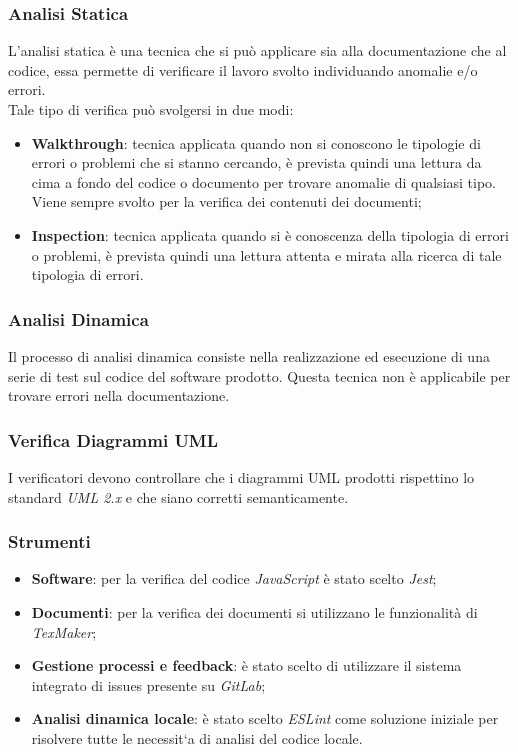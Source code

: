 \subsubsection{Analisi Statica}
L'analisi statica è una tecnica che si può applicare sia alla documentazione che al codice, essa permette di verificare il lavoro svolto individuando anomalie e/o errori.\\
Tale tipo di verifica può svolgersi in due modi:
\begin{itemize}
	\item \textbf{Walkthrough}: tecnica applicata quando non si conoscono le tipologie di errori o problemi che si stanno cercando, è prevista quindi una lettura da cima a fondo del codice o documento per trovare anomalie di qualsiasi tipo.\\
	Viene sempre svolto per la verifica dei contenuti dei documenti;
	\item \textbf{Inspection}: tecnica applicata quando si è conoscenza della tipologia di errori o problemi, è prevista quindi una lettura attenta e mirata alla ricerca di tale tipologia di errori.
\end{itemize}

\subsubsection{Analisi Dinamica}
Il processo di analisi dinamica consiste nella realizzazione ed esecuzione di una serie di test sul codice del software prodotto. Questa tecnica non è applicabile per trovare errori nella documentazione.

\subsubsection{Verifica Diagrammi UML}
I verificatori devono controllare che i diagrammi UML prodotti rispettino lo standard \textit{UML 2.x} e che siano corretti semanticamente.

\subsubsection{Strumenti}
\begin{itemize}
	\item \textbf{Software}: per la verifica del codice \textit{JavaScript} è stato scelto \textit{Jest};
	\item \textbf{Documenti}: per la verifica dei documenti si utilizzano le funzionalità di \textit{TexMaker};
	\item \textbf{Gestione processi e feedback}: è stato scelto di utilizzare il sistema integrato di issues presente su \textit{GitLab};
	\item \textbf{Analisi dinamica locale}: è stato scelto \textit{ESLint} come soluzione iniziale per risolvere tutte le necessit`a di analisi del codice locale.
\end{itemize}


